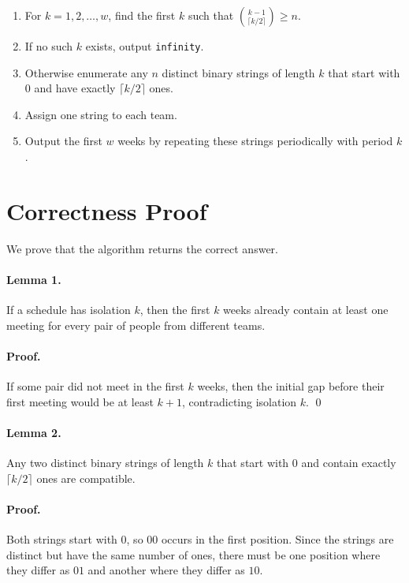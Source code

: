 \documentclass[11pt]{article}
\begin{document}
\begin{enumerate}[leftmargin=*]
    \item For $k=1,2,\dots,w$, find the first $k$ such that
    $\binom{k-1}{\lceil k/2\rceil} \ge n$.
    \item If no such $k$ exists, output \texttt{infinity}.
    \item Otherwise enumerate any $n$ distinct binary strings of length $k$ that start with $0$ and have
    exactly $\lceil k/2\rceil$ ones.
    \item Assign one string to each team.
    \item Output the first $w$ weeks by repeating these strings periodically with period $k$.
\end{enumerate}

\section*{Correctness Proof}

We prove that the algorithm returns the correct answer.

\paragraph{Lemma 1.}
If a schedule has isolation $k$, then the first $k$ weeks already contain at least one meeting for every
pair of people from different teams.

\paragraph{Proof.}
If some pair did not meet in the first $k$ weeks, then the initial gap before their first meeting would be at
least $k+1$, contradicting isolation $k$. \qed

\paragraph{Lemma 2.}
Any two distinct binary strings of length $k$ that start with $0$ and contain exactly $\lceil k/2\rceil$
ones are compatible.

\paragraph{Proof.}
Both strings start with $0$, so $00$ occurs in the first position. Since the strings are distinct but have the
same number of ones, there must be one position where they differ as $01$ and another where they differ
as $10$.
\end{document}
